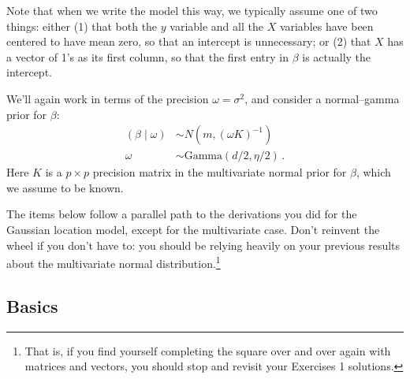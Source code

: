\documentclass[11pt]{article}
\begin{document}
Note that when we write the model this way, we typically assume one of two things: either (1) that both the $y$ variable and all the $X$ variables have been centered to have mean zero, so that an intercept is unnecessary; or (2) that $X$ has a vector of 1's as its first column, so that the first entry in $\beta$ is actually the intercept.

We'll again work in terms of the precision $\omega = \sigma^2$, and consider a normal--gamma prior for $\beta$:
\begin{align}
(\beta \mid \omega) &\sim N(m, (\omega K)^{-1}) \\
\omega &\sim \mbox{Gamma}(d/2, \eta/2) \, .
\end{align}
Here $K$ is a $p \times p$ precision matrix in the multivariate normal prior for $\beta$, which we assume to be known.

The items below follow a parallel path to the derivations you did for the Gaussian location model, except for the multivariate case.  Don't reinvent the wheel if you don't have to: you should be relying heavily on your previous results about the multivariate normal distribution.\footnote{That is, if you find yourself completing the square over and over again with matrices and vectors, you should stop and revisit your Exercises 1 solutions.}

\subsection{Basics}
\end{document}
